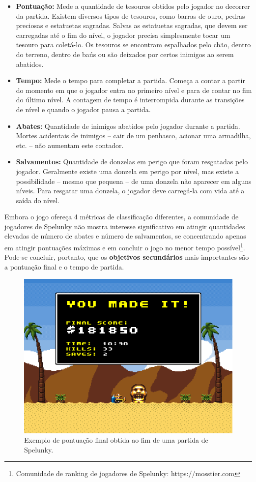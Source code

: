 \begin{itemize}
	\item \textbf{Pontuação:} Mede a quantidade de tesouros obtidos pelo jogador
	no decorrer da partida. Existem diversos tipos de tesouros, como barras de
	ouro, pedras preciosas e estatuetas sagradas. Salvas as estatuetas sagradas,
	que devem ser carregadas até o fim do nível, o jogador precisa simplesmente
	tocar um tesouro para coletá-lo. Os tesouros se encontram espalhados pelo
	chão, dentro do terreno, dentro de baús ou são deixados por certos inimigos
	ao serem abatidos.

	\item \textbf{Tempo:} Mede o tempo para completar a partida. Começa a contar
	a partir do momento em que o jogador entra no primeiro nível e para de
	contar no fim do último nível. A contagem de tempo é interrompida durante as
	transições de nível e quando o jogador pausa a partida.

	\item \textbf{Abates:} Quantidade de inimigos abatidos pelo jogador durante
	a partida. Mortes acidentais de inimigos -- cair de um penhasco, acionar uma
	armadilha, etc. -- não aumentam este contador.

	\item \textbf{Salvamentos:} Quantidade de donzelas em perigo que foram
	resgatadas pelo jogador. Geralmente existe uma donzela em perigo por nível,
	mas existe a possibilidade -- mesmo que pequena -- de uma donzela não
	aparecer em alguns níveis. Para resgatar uma donzela, o jogador deve
	carregá-la com vida até a saída do nível.
\end{itemize}

Embora o jogo ofereça 4 métricas de classificação diferentes, a comunidade de
jogadores de Spelunky não mostra interesse significativo em atingir quantidades
elevadas de número de abates e número de salvamentos, se concentrando apenas em
atingir pontuações máximas e em concluir o jogo no menor tempo
possível\footnote{Comunidade de ranking de jogadores de Spelunky:
https://mosstier.com}. Pode-se concluir, portanto, que os \textbf{objetivos
secundários} mais importantes são a pontuação final e o tempo de partida.

\begin{figure}[htb!]
\centering
\includegraphics[width=.65\textwidth]{fig/spelunky-score.png}
\caption{\label{fig:spelunky-scores}Exemplo de pontuação final obtida ao fim de
uma partida de Spelunky.}
\end{figure}


